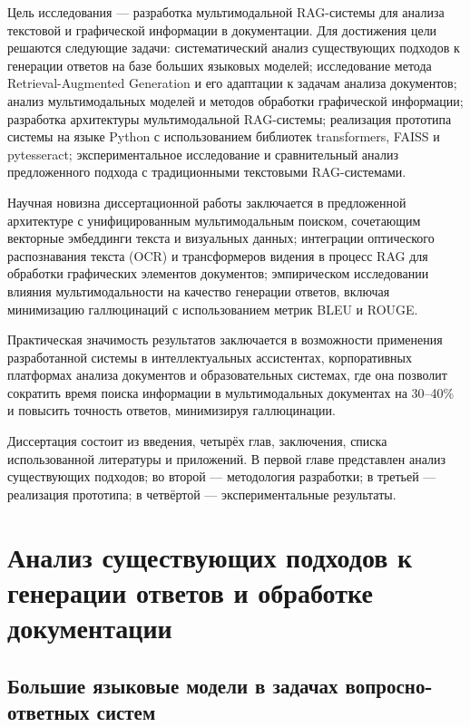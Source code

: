 \documentclass[a4paper,12pt]{article}
\begin{document}
Цель исследования --- разработка мультимодальной RAG-системы для анализа текстовой и графической информации в документации. Для достижения цели решаются следующие задачи: систематический анализ существующих подходов к генерации ответов на базе больших языковых моделей; исследование метода Retrieval-Augmented Generation и его адаптации к задачам анализа документов; анализ мультимодальных моделей и методов обработки графической информации; разработка архитектуры мультимодальной RAG-системы; реализация прототипа системы на языке Python с использованием библиотек transformers, FAISS и pytesseract; экспериментальное исследование и сравнительный анализ предложенного подхода с традиционными текстовыми RAG-системами.

Научная новизна диссертационной работы заключается в предложенной архитектуре с унифицированным мультимодальным поиском, сочетающим векторные эмбеддинги текста и визуальных данных; интеграции оптического распознавания текста (OCR) и трансформеров видения в процесс RAG для обработки графических элементов документов; эмпирическом исследовании влияния мультимодальности на качество генерации ответов, включая минимизацию галлюцинаций с использованием метрик BLEU и ROUGE.

Практическая значимость результатов заключается в возможности применения разработанной системы в интеллектуальных ассистентах, корпоративных платформах анализа документов и образовательных системах, где она позволит сократить время поиска информации в мультимодальных документах на 30--40\% и повысить точность ответов, минимизируя галлюцинации.

Диссертация состоит из введения, четырёх глав, заключения, списка использованной литературы и приложений. В первой главе представлен анализ существующих подходов; во второй --- методология разработки; в третьей --- реализация прототипа; в четвёртой --- экспериментальные результаты.


\newpage



\section{Анализ существующих подходов к генерации ответов и обработке документации}

\subsection{Большие языковые модели в задачах вопросно-ответных систем}
\end{document}
